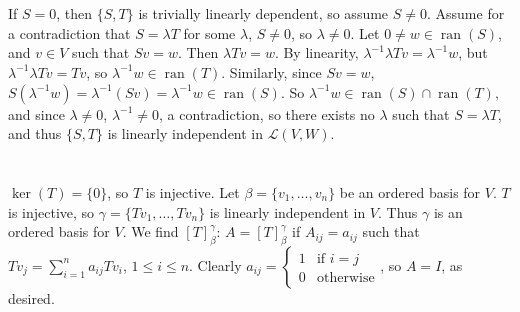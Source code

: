\documentclass[11pt]{article}
\DeclareMathOperator{\ran}{ran}
\begin{document}
\section{} %
If $S=0$, then $\{S,T\}$ is trivially linearly dependent, so assume $S\neq0$.
Assume for a contradiction that $S=\lambda T$ for some $\lambda$, $S\neq0$, so
$\lambda\neq0$. Let $0\neq w\in\ran(S)$, and $v\in V$ such that $Sv=w$. Then
$\lambda Tv=w$. By linearity, $\lambda^{-1}\lambda Tv=\lambda^{-1}w$,
but $\lambda^{-1}\lambda Tv=Tv$, so $\lambda^{-1}w\in\ran(T)$. Similarly,
since $Sv=w$, $S(\lambda^{-1}w)=\lambda^{-1}(Sv)=\lambda^{-1}w\in\ran(S)$. So
$\lambda^{-1}w\in\ran(S)\cap\ran(T)$, and since $\lambda\neq0$,
$\lambda^{-1}\neq0$, a contradiction, so there exists no $\lambda$ such that
$S=\lambda T$, and thus $\{S,T\}$ is linearly independent in
$\mathcal{L}(V,W)$.


\section{} %
$\ker(T)=\{0\}$, so $T$ is injective.
\newline
\newline
Let $\beta=\{v_1,\ldots,v_n\}$ be an ordered basis for $V$. $T$ is injective,
so $\gamma=\{Tv_1,\ldots,Tv_n\}$ is linearly independent in $V$. Thus
$\gamma$ is an ordered basis for $V$. We find $[T]_\beta^\gamma$:
\newline
\newline
$A=[T]_\beta^\gamma$ if $A_{ij}=a_{ij}$ such that
$Tv_j=\sum_{i=1}^na_{ij}Tv_i$, $1\le i\le n$. Clearly $a_{ij}=\begin{cases}
	1 & \text{if $i=j$}\\
	0 & \text{otherwise}
\end{cases}$, so $A=I$, as desired.
\end{document}
